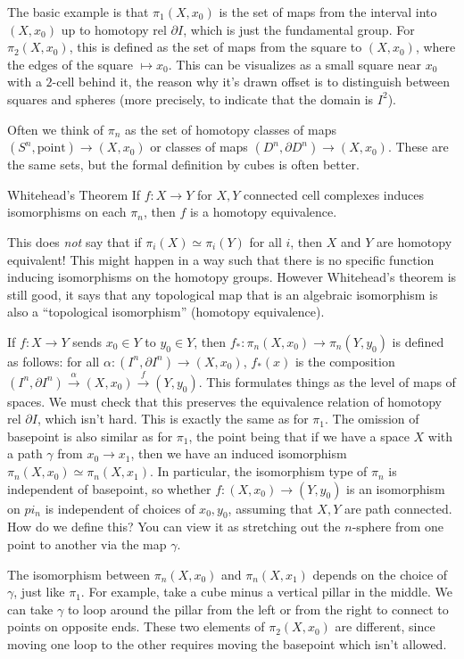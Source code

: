 \begin{example}
    The basic example is that $\pi_1(X,x_0)$ is the set of maps from the interval into $(X,x_0)$ up to homotopy rel $\partial I$, which is just the fundamental group. For $\pi_2(X,x_0)$, this is defined as the set of maps from the square to $(X,x_0)$, where the edges of the square $\mapsto x_0$. This can be visualizes as a small square near $x_0$ with a $2$-cell behind it, the reason why it's drawn offset is to distinguish between squares and spheres (more precisely, to indicate that the domain is $I^2$).
\end{example}
Often we think of $\pi_n $ as the set of homotopy classes of maps $(S^n ,\text{point} )\to (X,x_0)$ or classes of maps $(D^n ,\partial D^n )\to (X,x_0)$. These are the same sets, but the formal definition by cubes is often better.
\begin{namedthm}{Whitehead's Theorem}
    If $f\colon X \to Y$ for $X,Y$ connected cell complexes induces isomorphisms on each $\pi_n $, then $f$ is a homotopy equivalence.
\end{namedthm}
\begin{note}
    This does \emph{not} say that if $\pi_i (X)\simeq \pi_i (Y)$ for all $i$, then $X$ and $Y$ are homotopy equivalent! This might happen in a way such that there is no specific function inducing isomorphisms on the homotopy groups. However Whitehead's theorem is still good, it says that any topological map that is an algebraic isomorphism is also a ``topological isomorphism'' (homotopy equivalence).
\end{note}
If $f\colon X \to Y$ sends $x_0\in Y$ to $y_0\in Y$, then $f_* \colon \pi_n (X,x_0) \to \pi_n (Y,y_0)$ is defined as follows: for all $\alpha \colon (I^n ,\partial I^n )\to (X,x_0) $, $f_*(x)$ is the composition $(I^n ,\partial I^n )\overset{\alpha }{\longrightarrow} (X,x_0)\overset{f}{\longrightarrow} (Y,y_0)$. This formulates things as the level of maps of spaces. We must check that this preserves the equivalence relation of homotopy rel $\partial I$, which isn't hard. This is exactly the same as for $\pi_1$. The omission of basepoint is also similar as for $\pi_1$, the point being that if we have a space $X$ with a path $\gamma$ from $x_0\to x_1$, then we have an induced isomorphism $\pi_n (X,x_0)\simeq \pi_n (X,x_1)$. In particular, the isomorphism type of $\pi_n $ is independent of basepoint, so whether $f\colon (X,x_0) \to (Y,y_0)$ is an isomorphism on $pi_n $ is independent of choices of $x_0,y_0$, assuming that $X,Y$ are path connected. How do we define this? You can view it as stretching out the $n$-sphere from one point to another via the map $\gamma$.
\begin{note}
    The isomorphism between $\pi_n (X,x_0)$ and $\pi_n (X,x_1)$ depends on the choice of $\gamma$, just like $\pi_1.$ For example, take a cube minus a vertical pillar in the middle. We can take $\gamma$ to loop around the pillar from the left or from the right to connect to points on opposite ends. These two elements of $\pi_2(X,x_0)$ are different, since moving one loop to the other requires moving the basepoint which isn't allowed.
\end{note}
